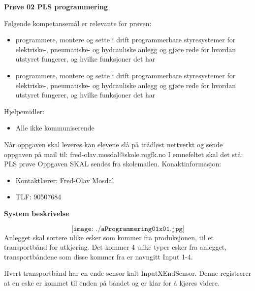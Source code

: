 

\begin{centering}
\Huge{\textbf{Prøve 02 PLS programmering}}\\
\end{centering}
\vskip 2cm 
Følgende kompetansemål er relevante for prøven:
\begin{itemize}[noitemsep]


	\item programmere, montere og sette i drift programmerbare styresystemer for elektriske-, pneumatiske- og hydrauliske anlegg og gjøre rede for hvordan utstyret fungerer, og hvilke funksjoner det har

	\item programmere, montere og sette i drift programmerbare styresystemer for elektriske-, pneumatiske- og hydrauliske anlegg og gjøre rede for hvordan utstyret fungerer, og hvilke funksjoner det har
\end{itemize}
\vskip 2.5pt 
Hjelpemidler:\begin{itemize}[noitemsep]
	\item Alle ikke kommuniserende
\end{itemize}

\vskip 5pt 
\vskip 10pt 
\vskip 2.5pt 
\vskip 2.5pt 
Når oppgaven skal leveres kan elevene slå på trådløst nettverkt og sende oppgaven på mail til:
\vskip 2.5pt 
fred-olav.mosdal@skole.rogfk.no
\vskip 2.5pt 
I emnefeltet skal det stå: PLS prøve
\vskip 2.5pt
Oppgaven SKAL sendes fra skolemailen. 
\vskip 2cm   
Konaktinformasjon:
\begin{itemize}[noitemsep]
	\item Kontaktlærer: Fred-Olav Mosdal
	\item TLF: 90507684
\end{itemize}
\vfil\eject
\textbf{System beskrivelse}

$$\texttt{[image: ./aProgrammering01x01.jpg]}$$
Anlegget skal sortere ulike esker som kommer fra produksjonen, til et transportbånd for utkjøring. Det kommer 4 ulike typer esker fra anlegget, transportbåndene som disse kommer fra er navngitt Input 1-4. 

\vskip 5pt 
Hvert transportbånd har en ende sensor kalt InputXEndSensor. Denne registrerer at en eske er kommet til enden på båndet og er klar for å kjøres videre. 

